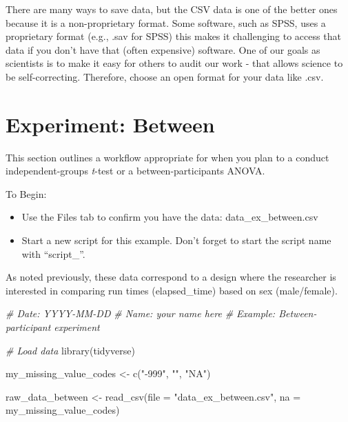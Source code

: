 \documentclass[
]{krantz}
\makeatletter
\newenvironment{Shaded}{\begin{snugshade}}{\end{snugshade}}
\newcommand{\AttributeTok}[1]{\textcolor[rgb]{0.61,0.61,0.61}{#1}}
\newcommand{\CommentTok}[1]{\textcolor[rgb]{0.37,0.37,0.37}{\textit{#1}}}
\newcommand{\FunctionTok}[1]{\textcolor[rgb]{0,0,0}{#1}}
\newcommand{\NormalTok}[1]{#1}
\newcommand{\OtherTok}[1]{\textcolor[rgb]{0.37,0.37,0.37}{#1}}
\newcommand{\StringTok}[1]{\textcolor[rgb]{0.5,0.5,0.5}{#1}}
\newenvironment{kframe}{%
\medskip{}
\setlength{\fboxsep}{.8em}
 \def\at@end@of@kframe{}%
 \ifinner\ifhmode%
  \def\at@end@of@kframe{\end{minipage}}%
  \begin{minipage}{\columnwidth}%
 \fi\fi%
 \def\FrameCommand##1{\hskip\@totalleftmargin \hskip-\fboxsep
 \colorbox{shadecolor}{##1}\hskip-\fboxsep
     \hskip-\linewidth \hskip-\@totalleftmargin \hskip\columnwidth}%
 \MakeFramed {\advance\hsize-\width
   \@totalleftmargin\z@ \linewidth\hsize
   \@setminipage}}%
 {\par\unskip\endMakeFramed%
 \at@end@of@kframe}
\renewenvironment{Shaded}{\begin{kframe}}{\end{kframe}}
\makeatother
\begin{document}
There are many ways to save data, but the CSV data is one of the better ones because it is a non-proprietary format. Some software, such as SPSS, uses a proprietary format (e.g., .sav for SPSS) this makes it challenging to access that data if you don't have that (often expensive) software. One of our goals as scientists is to make it easy for others to audit our work - that allows science to be self-correcting. Therefore, choose an open format for your data like .csv.

\hypertarget{experiment-between}{%
\section{Experiment: Between}\label{experiment-between}}

This section outlines a workflow appropriate for when you plan to a conduct independent-groups \emph{t}-test or a between-participants ANOVA.

To Begin:

\begin{itemize}
\item
  Use the Files tab to confirm you have the data: data\_ex\_between.csv
\item
  Start a new script for this example. Don't forget to start the script name with ``script\_''.
\end{itemize}

As noted previously, these data correspond to a design where the researcher is interested in comparing run times (elapsed\_time) based on sex (male/female).

\begin{Shaded}
\begin{Highlighting}[]
\CommentTok{\# Date: YYYY{-}MM{-}DD}
\CommentTok{\# Name: your name here}
\CommentTok{\# Example: Between{-}participant experiment}

\CommentTok{\# Load data}
\FunctionTok{library}\NormalTok{(tidyverse)}

\NormalTok{my\_missing\_value\_codes }\OtherTok{\textless{}{-}} \FunctionTok{c}\NormalTok{(}\StringTok{"{-}999"}\NormalTok{, }\StringTok{""}\NormalTok{, }\StringTok{"NA"}\NormalTok{)}

\NormalTok{raw\_data\_between }\OtherTok{\textless{}{-}} \FunctionTok{read\_csv}\NormalTok{(}\AttributeTok{file =} \StringTok{"data\_ex\_between.csv"}\NormalTok{,}
                     \AttributeTok{na =}\NormalTok{ my\_missing\_value\_codes)}
\end{Highlighting}
\end{Shaded}
\end{document}
